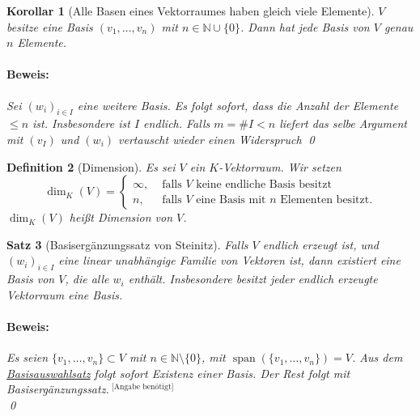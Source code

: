 \documentclass{report}
\newcommand{\IN}[1]{\index{#1|BH}}
\newcommand{\N}{\mathbb{N}}
\DeclareMathOperator{\Span}{span}
\theoremstyle{customrem}
\theoremstyle{customdef}
\newtheorem{definition}{Definition}[chapter]
\newtheorem{korrolar}[definition]{Korollar}
\newtheorem{satz}[definition]{Satz}
\renewenvironment{proof}{\paragraph{Beweis: }}{\qed}
\theoremstyle{customenv}
\begin{document}
	\begin{korrolar}[Alle Basen eines Vektorraumes haben gleich viele Elemente]
		\(V\) besitze eine Basis \((v_1, \dots, v_n)\) mit \(n \in \N \cup \{0\}\). Dann hat jede Basis von \(V\) genau \(n\) Elemente.
		
		\begin{proof}
			Sei \((w_i)_{i \in I}\) eine weitere Basis. Es folgt sofort, dass die Anzahl der Elemente \(\le n\) ist. Insbesondere ist \(I\) endlich. Falls \(m = \#I < n\) liefert das selbe Argument mit \((v_I)\) und \((w_i)\) vertauscht wieder einen Widerspruch \Lightning
		\end{proof}
	\end{korrolar}
	\vspace{.25cm}
	\begin{definition}[Dimension]
		\IN{Dimension}
		Es sei \(V\) ein \(K\)-Vektorraum. Wir setzen
		\[\dim_K(V) = \begin{cases}\infty,&\text{ falls \(V\) keine endliche Basis besitzt}\\n,&\text{ falls \(V\) eine Basis mit \(n\) Elementen besitzt.}\end{cases}\]
		\(\dim_K(V)\) heißt Dimension von \(V\).
	\end{definition}
	
	\begin{satz}[Basisergänzungssatz von Steinitz]
		\label{satz218}
		Falls \(V\) endlich erzeugt ist, und \((w_i)_{i \in I}\) eine linear unabhängige Familie von Vektoren ist, dann existiert eine Basis von \(V\), die alle \(w_i\) enthält. Insbesondere besitzt jeder endlich erzeugte Vektorraum eine Basis.\\
		
		\begin{proof}
			Es seien \(\{v_1, \dots, v_n\} \subset V\) mit \(n \in \N \setminus\{0\}\), mit \(\Span(\{v_1, \dots, v_n\}) = V\). Aus dem \hyperref[satz213]{Basisauswahlsatz} folgt sofort Existenz einer Basis. Der Rest folgt mit Basisergänzungssatz.\(^{\text{ [Angabe benötigt]}}\)\\
		\end{proof}
	\end{satz}
	
\end{document}
